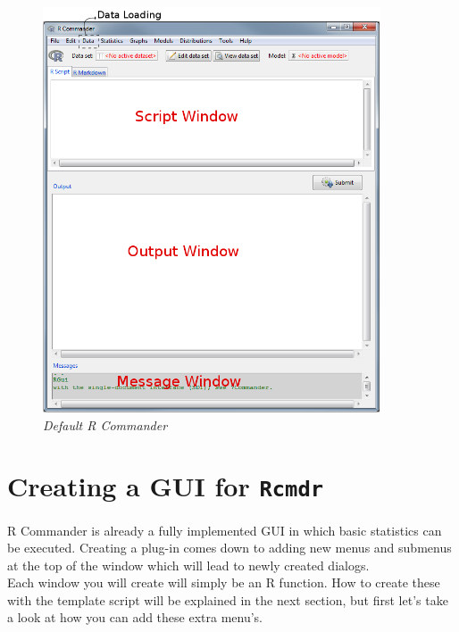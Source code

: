 \documentclass[a4paper]{article}\usepackage[]{graphicx}\usepackage[]{color}
\begin{document}
\begin{figure}[H]
\centering
\includegraphics[width=10cm]{figures/rcmdrwindow.png}
\caption{{\it Default R Commander}\label{rcmdrwindow}}
\end{figure}


\section{Creating a GUI for \texttt{Rcmdr}}
\noindent R Commander is already a fully implemented GUI in which basic
statistics can be executed. Creating a plug-in comes down to adding new menus and submenus at the
top of the window which will lead to newly created dialogs.\\
Each window you will create will simply be an R function. How to create these
with the template script will be explained in the next section, but first let's
take a look at how you can add these extra menu's.
\end{document}
